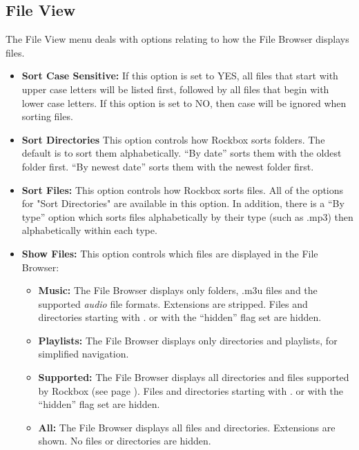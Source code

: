 \subsection{File View}
  The File View menu deals with options relating to how the File Browser displays files.
  
  \begin{itemize}
  \item \textbf{Sort Case Sensitive:  }
    If this option is set to YES, all files that start with upper case letters will be listed first, followed by all files that begin with lower case letters.  If this option is set to NO, then case will be ignored when sorting files.
  \item \textbf{Sort Directories}
    This option controls how Rockbox sorts folders.  The default is to sort them alphabetically. ``By date'' sorts them with the oldest folder first.  ``By newest date'' sorts them with the newest folder first.
    
  \item \textbf{Sort Files:  }
    This option controls how Rockbox sorts files.  All of the options for "Sort Directories" are available in this option.  In addition, there is a ``By type'' option which sorts files alphabetically by their type (such as .mp3) then alphabetically within each type.
    
  \item \textbf{\label{ref:ShowFiles}Show Files:  }
    This option controls which files are displayed in the File Browser:
    
    \begin{itemize}
    \item \textbf{Music: }The File Browser displays only folders, .m3u files and the supported \emph{audio} file formats.  Extensions are stripped.  Files and directories starting with . or with the ``hidden'' flag set are hidden.
    \item \textbf{Playlists:  }The File Browser displays only directories and playlists, for simplified navigation.
    \item \textbf{Supported:  }The File Browser displays all directories and files supported by Rockbox (see page \pageref{ref:Supportedfileformats}).  Files and directories starting with . or with the ``hidden'' flag set are hidden.
    \item \textbf{All:  }The File Browser displays all files and directories. Extensions are shown. No files or directories are hidden.
    \end{itemize}
    

\end{itemize}
